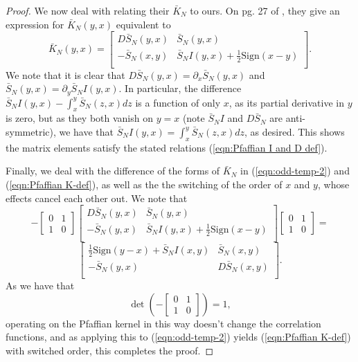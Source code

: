 \documentclass[12pt]{article}
\numberwithin{info}{section}
\numberwithin{equation}{section}
\renewcommand{\[}{\begin{equation}}
\renewcommand{\]}{\end{equation}}
\newcommand{\sign}{\mathrm{Sign}}
\newcommand{\<}{\langle}
\renewcommand{\>}{\rangle}
\newcommand{\Sb}{\bar{S}}
\begin{document}
\begin{proof}
		We now deal with relating their $\bar{K}_N$ to ours. On pg. 27 of \cite{sinclair}, they give an expression for $\bar{K}_N(y,x)$ equivalent to 
		\[\bar{K}_N(y,x)=\begin{bmatrix}
			D\Sb_N(y,x)& \Sb_N(y,x)\\
			-\Sb_N(x,y)& \Sb_NI(y,x)+\frac{1}{2}\sign(x-y)\\
		\end{bmatrix}.\label{eqn:odd-temp-2}\]
		We note that it is clear that $D\Sb_N(y,x)=\partial_x \Sb_N(y,x)$ and $\Sb_N(y,x)=\partial_y \Sb_NI(y,x)$. In particular, the difference $\Sb_NI(y,x)-\int_x^y \Sb_N(z,x)dz$ is a function of only $x$, as its partial derivative in $y$ is zero, but as they both vanish on $y=x$ (note $\Sb_NI$ and $D\Sb_N$ are anti-symmetric), we have that $\Sb_NI(y,x)=\int_x^y \Sb_N(z,x)dz$, as desired. This shows the matrix elements satisfy the stated relations (\ref{eqn:Pfaffian I and D def}).
		
		Finally, we deal with the difference of the forms of $\bar{K}_N$ in (\ref{eqn:odd-temp-2}) and (\ref{eqn:Pfaffian K-def}), as well as the the switching of the order of $x$ and $y$, whose effects cancel each other out. We note that
		\[-\begin{bmatrix}0 & 1\\ 1 & 0 \end{bmatrix}\begin{bmatrix}
			D\Sb_N(y,x)& \Sb_N(y,x)\\
			-\Sb_N(y,x)& \Sb_NI(y,x)+\frac{1}{2}\sign(x-y)\\
		\end{bmatrix}\begin{bmatrix}0 & 1\\ 1 & 0 \end{bmatrix}=\]
		\[\begin{bmatrix}
			\frac{1}{2}\sign(y-x)+\Sb_NI(x,y)& \Sb_N(x,y)\\
			-\Sb_N(y,x)& D\Sb_N(x,y)\\
		\end{bmatrix}.\]
		As we have that
		\[\det\left(-\begin{bmatrix}0 & 1\\ 1 & 0 \end{bmatrix}\right)=1,\]
		operating on the Pfaffian kernel in this way doesn't change the correlation functions, and as applying this to (\ref{eqn:odd-temp-2}) yields (\ref{eqn:Pfaffian K-def}) with switched order, this completes the proof.
		

\end{proof}
\end{document}
